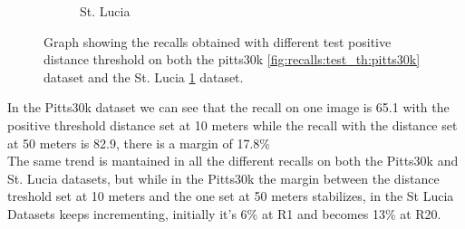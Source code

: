 \documentclass[10pt,twocolumn,letterpaper]{article}
\begin{document}
\begin{figure}[!h]
\begin{subfigure}[b]{0.23\textwidth}
		\caption{St. Lucia}
		\label{fig:recalls:test_th:st_lucia}
	\end{subfigure}
	\caption{Graph showing the recalls obtained with different test positive distance threshold on both the pitts30k \ref{fig:recalls:test_th:pitts30k} dataset and the St. Lucia \ref{fig:recalls:test_th:st_lucia} dataset.}
	\label{fig:recalls:test_th}
\end{figure}
In the Pitts30k dataset we can see that the recall on one image is 65.1 with the positive threshold distance set at 10 meters while the recall with the distance set at 50 meters is 82.9, there is a margin of 17.8\%\\
The same trend is mantained in all the different recalls on both the Pitts30k and St. Lucia datasets, but while in the Pitts30k the margin between the distance treshold set at 10 meters and the one set at 50 meters stabilizes, in the St Lucia Datasets keeps incrementing, initially it's 6\% at R1 and becomes 13\% at R20.
\end{document}
